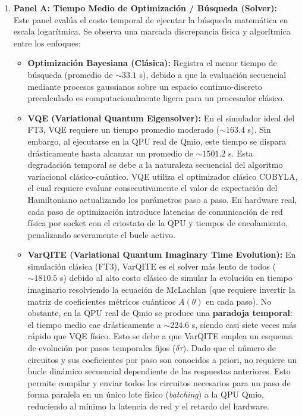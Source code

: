\begin{enumerate}
    \item \textbf{Panel A: Tiempo Medio de Optimización / Búsqueda (Solver):} \\
    Este panel evalúa el costo temporal de ejecutar la búsqueda matemática en escala logarítmica. Se observa una marcada discrepancia física y algorítmica entre los enfoques:
    \begin{itemize}
        \item \textbf{Optimización Bayesiana (Clásica):} Registra el menor tiempo de búsqueda (promedio de $\sim 33.1$ s), debido a que la evaluación secuencial mediante procesos gaussianos sobre un espacio continuo-discreto precalculado es computacionalmente ligera para un procesador clásico.
        \item \textbf{VQE (Variational Quantum Eigensolver):} En el simulador ideal del FT3, VQE requiere un tiempo promedio moderado ($\sim 163.4$ s). Sin embargo, al ejecutarse en la QPU real de Qmio, este tiempo se dispara drásticamente hasta alcanzar un promedio de $\sim 1501.2$ s. Esta degradación temporal se debe a la naturaleza secuencial del algoritmo variacional clásico-cuántico. VQE utiliza el optimizador clásico COBYLA, el cual requiere evaluar consecutivamente el valor de expectación del Hamiltoniano actualizando los parámetros paso a paso. En hardware real, cada paso de optimización introduce latencias de comunicación de red física por socket con el criostato de la QPU y tiempos de encolamiento, penalizando severamente el bucle activo.
        \item \textbf{VarQITE (Variational Quantum Imaginary Time Evolution):} En simulación clásica (FT3), VarQITE es el solver más lento de todos ($\sim 1810.5$ s) debido al alto costo clásico de simular la evolución en tiempo imaginario resolviendo la ecuación de McLachlan (que requiere invertir la matriz de coeficientes métricos cuánticos $A(\theta)$ en cada paso). No obstante, en la QPU real de Qmio se produce una \textbf{paradoja temporal}: el tiempo medio cae drásticamente a $\sim 224.6$ s, siendo casi siete veces más rápido que VQE físico. Esto se debe a que VarQITE emplea un esquema de evolución por pasos temporales fijos ($\delta \tau$). Dado que el número de circuitos y sus coeficientes por paso son conocidos a priori, no requiere un bucle dinámico secuencial dependiente de las respuestas anteriores. Esto permite compilar y enviar todos los circuitos necesarios para un paso de forma paralela en un único lote físico (\textit{batching}) a la QPU Qmio, reduciendo al mínimo la latencia de red y el retardo del hardware.
    \end{itemize}


\end{enumerate}
